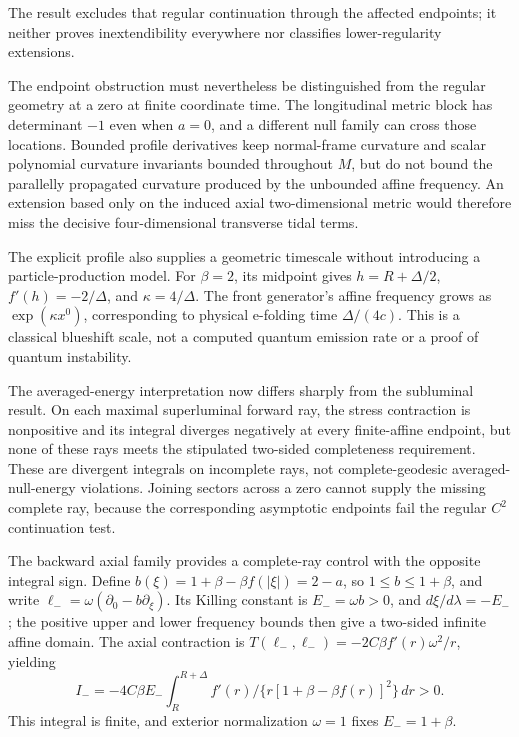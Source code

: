 \documentclass[11pt]{article}
\begin{document}
The result excludes that regular continuation through the affected endpoints; it neither proves inextendibility everywhere nor classifies lower-regularity extensions.

The endpoint obstruction must nevertheless be distinguished from the regular geometry at a zero at finite coordinate time. The longitudinal metric block has determinant $-1$ even when $a=0$, and a different null family can cross those locations. Bounded profile derivatives keep normal-frame curvature and scalar polynomial curvature invariants bounded throughout $M$, but do not bound the parallelly propagated curvature produced by the unbounded affine frequency. An extension based only on the induced axial two-dimensional metric would therefore miss the decisive four-dimensional transverse tidal terms.

The explicit profile also supplies a geometric timescale without introducing a particle-production model. For $\beta=2$, its midpoint gives $h=R+\Delta/2$, $f'(h)=-2/\Delta$, and $\kappa=4/\Delta$. The front generator's affine frequency grows as $\exp(\kappa x^0)$, corresponding to physical e-folding time $\Delta/(4c)$. This is a classical blueshift scale, not a computed quantum emission rate or a proof of quantum instability.

The averaged-energy interpretation now differs sharply from the subluminal result. On each maximal superluminal forward ray, the stress contraction is nonpositive and its integral diverges negatively at every finite-affine endpoint, but none of these rays meets the stipulated two-sided completeness requirement. These are divergent integrals on incomplete rays, not complete-geodesic averaged-null-energy violations. Joining sectors across a zero cannot supply the missing complete ray, because the corresponding asymptotic endpoints fail the regular $C^2$ continuation test.

The backward axial family provides a complete-ray control with the opposite integral sign. Define $b(\xi)=1+\beta-\beta f(|\xi|)=2-a$, so $1\leq b\leq1+\beta$, and write $\ell_-=\omega(\partial_0-b\partial_\xi)$. Its Killing constant is $E_-=\omega b>0$, and $d\xi/d\lambda=-E_-$; the positive upper and lower frequency bounds then give a two-sided infinite affine domain. The axial contraction is $T(\ell_-,\ell_-)=-2C\beta f'(r)\omega^2/r$, yielding \[I_-=-4C\beta E_-\int_R^{R+\Delta}f'(r)\big/\{r[1+\beta-\beta f(r)]^2\}\,dr>0.\] This integral is finite, and exterior normalization $\omega=1$ fixes $E_-=1+\beta$.
\end{document}
